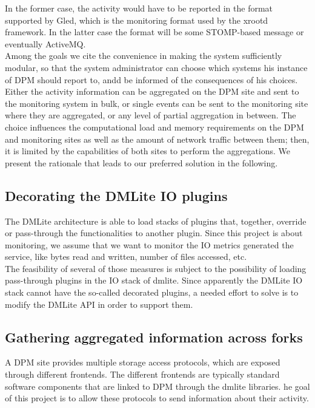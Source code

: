 \documentclass[12pt]{article} %
\begin{document}
In the former case, the activity would have to be reported in the format supported by Gled, which is the monitoring format used by the xrootd framework. In the latter case the format will be some STOMP-based message or eventually ActiveMQ.\\

Among the goals we cite the convenience in making the system sufficiently modular, so that the system administrator can choose which systems his instance of DPM should report to, andd be informed of the consequences of his choices.\\


Either the activity information can be aggregated on the DPM site and sent to the monitoring system in bulk, or single events can be sent to the monitoring site where they are aggregated, or any level of partial aggregation in between. The choice influences the computational load and memory requirements on the DPM and monitoring sites as well as the amount of network traffic between them; then, it is limited by the capabilities of both sites to perform the aggregations. We present the rationale that leads to our preferred solution in the following.

\subsection{Decorating the DMLite IO plugins}
The DMLite architecture is able to load stacks of plugins that, together, override or pass-through the functionalities to another plugin. Since this project is about monitoring, we assume that we want to monitor the IO metrics generated the service, like bytes read and written, number of files accessed, etc.\\
The feasibility of several of those measures is subject to the possibility of loading pass-through plugins in the IO stack of dmlite. Since apparently the DMLite IO stack cannot have the so-called decorated plugins, a needed effort to solve is to modify the DMLite API in order to support them.

\subsection{Gathering aggregated information across forks}
A DPM site provides multiple storage access protocols, which are exposed through different frontends. The different frontends are typically standard software components that are linked to DPM through the dmlite libraries. he goal of this project is to allow these protocols to send information about their activity.
\end{document}
